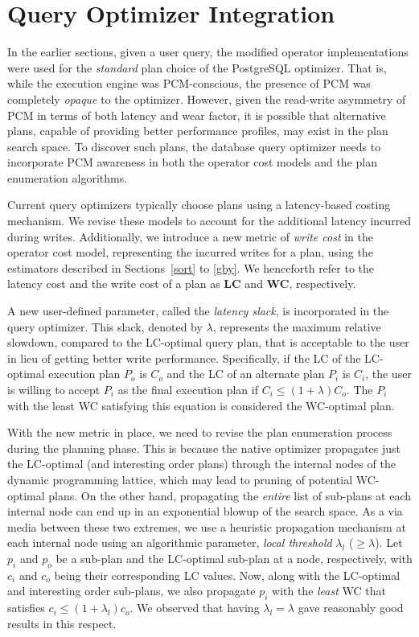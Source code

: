 \section{Query Optimizer Integration}
\label{discussion}

In the earlier sections, given a user query, the modified operator
implementations were used for the \emph{standard} plan choice
of the PostgreSQL optimizer. That is, while the execution engine was PCM-conscious,
the presence of PCM was completely \emph{opaque} to the optimizer.
However, given the read-write asymmetry of PCM in terms of both latency and wear
factor, it is possible that alternative plans, capable of providing better
performance profiles, may exist in the plan search space. To discover
such plans, the database query optimizer needs to incorporate PCM
awareness in both the operator cost models and the plan enumeration
algorithms.

Current query optimizers typically choose plans using a latency-based
costing mechanism. We revise these models to account for the additional
latency incurred during writes. Additionally, we introduce a new metric of
\emph{write cost} in the operator cost model, representing the incurred
writes for a plan, using the estimators described in Sections~\ref{sort}
to \ref{gby}. We henceforth refer to the latency cost and the write cost
of a plan as {\bf LC} and {\bf WC}, respectively.

A new user-defined parameter, called the \emph{latency slack}, is
incorporated in the query optimizer.  This slack, denoted by $\lambda$,
represents the maximum relative slowdown, compared to the LC-optimal
query plan, that is acceptable to the user in lieu of getting better
write performance. Specifically, if the LC of the LC-optimal execution
plan $P_o$ is $C_o$ and the LC of an alternate plan $P_i$ is $C_i$, the
user is willing to accept $P_i$ as the final execution plan if $C_i \le
(1+\lambda) C_o$. The $P_i$ with the least WC satisfying this equation
is considered the WC-optimal plan.

With the new metric in place, we need to revise the plan enumeration
process during the planning phase. This is because the native optimizer
propagates just the LC-optimal (and interesting order plans) through
the internal nodes of the dynamic programming lattice, which may lead
to pruning of potential WC-optimal plans. On the other hand, propagating
the \emph{entire} list of sub-plans at each internal node can end up in
an exponential blowup of the search space.  As a via media between these
two extremes, we use a heuristic propagation mechanism at each internal
node using an algorithmic parameter, \emph{local threshold} $\lambda_l$
($\ge\lambda$). Let  $p_i$ and $p_o$ be a sub-plan and the LC-optimal
sub-plan at a node, respectively, with $c_i$ and $c_o$ being their
corresponding LC values. Now, along with the LC-optimal and interesting
order sub-plans, we also propagate $p_i$ with the \emph{least} WC that
satisfies $c_i \le (1+\lambda_l) c_o$. We observed that
having $\lambda_l = \lambda$ gave reasonably good results in this respect.

